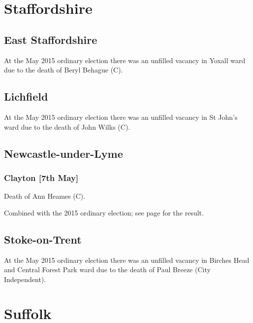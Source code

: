 \documentclass[a4paper,openany]{book}
\begin{document}
\begin{resultsiii}
\section{Staffordshire}

\subsection*{East Staffordshire}

At the May 2015 ordinary election there was an unfilled vacancy in Yoxall ward due to the death of Beryl Behague (C).

\subsection*{Lichfield}

At the May 2015 ordinary election there was an unfilled vacancy in St John's ward due to the death of John Wilks (C).

\subsection*{Newcastle-under-Lyme}

\subsubsection*{Clayton \hspace*{\fill}\nolinebreak[1]%
\enspace\hspace*{\fill}
[7th May]}


Death of Ann Heames (C).

Combined with the 2015 ordinary election; see page \pageref{ClaytonNewcastleLyme} for the result.

\subsection*{Stoke-on-Trent}

At the May 2015 ordinary election there was an unfilled vacancy in Birches Head and Central Forest Park ward due to the death of Paul Breeze (City Independent).

\section{Suffolk}


\end{resultsiii}
\end{document}
